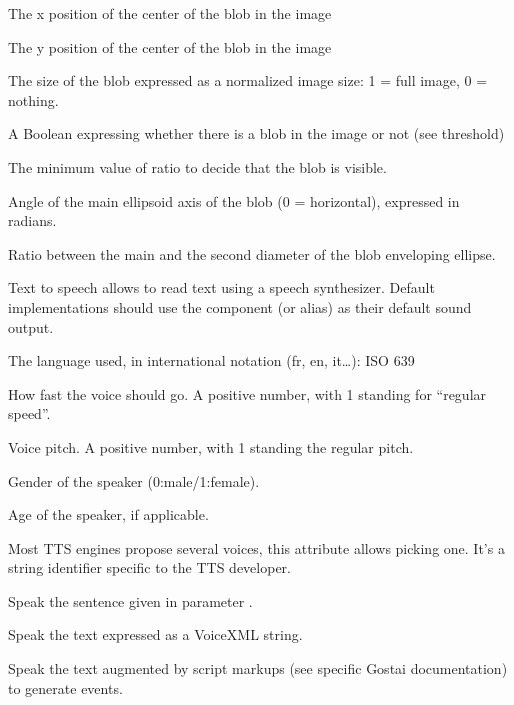 \begin{slots}
  {%
    The x position of the center of the blob in the image%
  }

  {%
    The y position of the center of the blob in the image%
  }

  {%
    The size of the blob expressed as a normalized image size: 1 =
    full image, 0 = nothing.%
  }

  {%
    A Boolean expressing whether there is a blob in the image or not
    (see threshold)%
  }

  {%
    The minimum value of ratio to decide that the blob is visible.%
  }

  {%
    Angle of the main ellipsoid axis of the blob (0 = horizontal),
    expressed in radians.%
  }

  {%
    Ratio between the main and the second diameter of the blob
    enveloping ellipse.%
  }

\end{slots}

Text to speech allows to read text using a speech synthesizer. Default
implementations should use the  component (or alias) as
their default sound output.

\begin{slots}
  {%
    The language used, in international notation (fr, en, it…): ISO
    639%
  }

  {%
    How fast the voice should go.  A positive number, with 1 standing
    for ``regular speed''.
  }

  {%
    Voice pitch.  A positive number, with 1 standing the regular pitch.%
  }

  {%
    Gender of the speaker (0:male/1:female).%
  }

  {%
    Age of the speaker, if applicable.%
  }

  {%
    Most TTS engines propose several voices, this attribute
    allows picking one. It's a string identifier specific to the TTS
    developer.%
  }

  {%
    Speak the sentence given in parameter .%
  }

  {%
    Speak the text  expressed as a VoiceXML string.%
  }

  {%
    Speak the text  augmented by script markups (see specific
    Gostai documentation) to generate \urbi events.%
  }

\end{slots}


